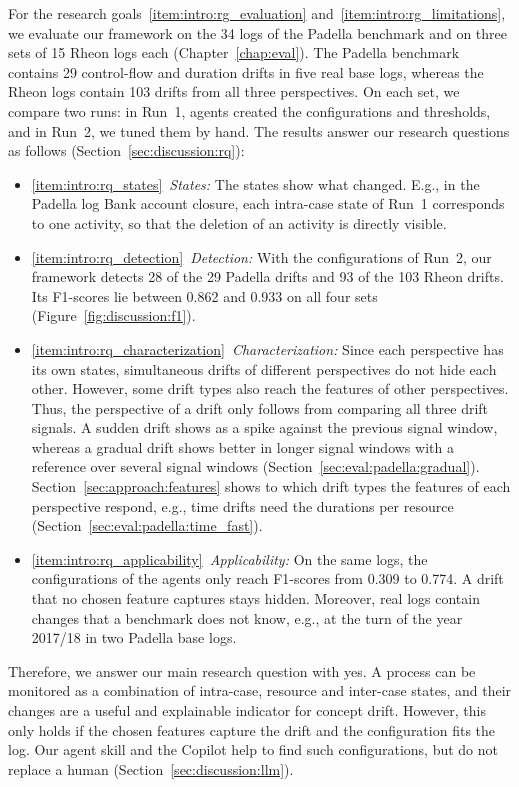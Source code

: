 For the research goals~\ref{item:intro:rg_evaluation} and~\ref{item:intro:rg_limitations}, we evaluate our framework on the 34 logs of the Padella benchmark and on three sets of 15 Rheon logs each (Chapter~\ref{chap:eval}). The Padella benchmark contains 29 control-flow and duration drifts in five real base logs, whereas the Rheon logs contain 103 drifts from all three perspectives. On each set, we compare two runs: in Run~1, agents created the configurations and thresholds, and in Run~2, we tuned them by hand. The results answer our research questions as follows (Section~\ref{sec:discussion:rq}):
\begin{itemize}
	\item \ref{item:intro:rq_states}~\emph{States:} The states show what changed. E.g., in the Padella log Bank account closure, each intra-case state of Run~1 corresponds to one activity, so that the deletion of an activity is directly visible.
	\item \ref{item:intro:rq_detection}~\emph{Detection:} With the configurations of Run~2, our framework detects 28 of the 29 Padella drifts and 93 of the 103 Rheon drifts. Its F1-scores lie between 0.862 and 0.933 on all four sets (Figure~\ref{fig:discussion:f1}).
	\item \ref{item:intro:rq_characterization}~\emph{Characterization:} Since each perspective has its own states, simultaneous drifts of different perspectives do not hide each other. However, some drift types also reach the features of other perspectives. Thus, the perspective of a drift only follows from comparing all three drift signals. A sudden drift shows as a spike against the previous signal window, whereas a gradual drift shows better in longer signal windows with a reference over several signal windows (Section~\ref{sec:eval:padella:gradual}). Section~\ref{sec:approach:features} shows to which drift types the features of each perspective respond, e.g., time drifts need the durations per resource (Section~\ref{sec:eval:padella:time_fast}).
	\item \ref{item:intro:rq_applicability}~\emph{Applicability:} On the same logs, the configurations of the agents only reach F1-scores from 0.309 to 0.774. A drift that no chosen feature captures stays hidden. Moreover, real logs contain changes that a benchmark does not know, e.g., at the turn of the year 2017/18 in two Padella base logs.
\end{itemize}

Therefore, we answer our main research question with yes. A process can be monitored as a combination of intra-case, resource and inter-case states, and their changes are a useful and explainable indicator for concept drift. However, this only holds if the chosen features capture the drift and the configuration fits the log. Our agent skill and the Copilot help to find such configurations, but do not replace a human (Section~\ref{sec:discussion:llm}).

